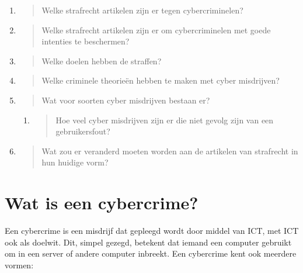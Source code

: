 \documentclass[
]{article}
\begin{document}
\begin{enumerate}
\def\labelenumi{\roman{enumi}.}
\item
  \begin{quote}
  Welke strafrecht artikelen zijn er tegen cybercriminelen?
  \end{quote}
\item
  \begin{quote}
  Welke strafrecht artikelen zijn er om cybercriminelen met goede
  intenties te beschermen?
  \end{quote}
\item
  \begin{quote}
  Welke doelen hebben de straffen?
  \end{quote}
\item
  \begin{quote}
  Welke criminele theorieën hebben te maken met cyber misdrijven?
  \end{quote}
\item
  \begin{quote}
  Wat voor soorten cyber misdrijven bestaan er?
  \end{quote}

  \begin{enumerate}
  \def\labelenumii{\alph{enumii}.}
  \item
    \begin{quote}
    Hoe veel cyber misdrijven zijn er die niet gevolg zijn van een
    gebruikersfout?
    \end{quote}
  \end{enumerate}
\item
  \begin{quote}
  Wat zou er veranderd moeten worden aan de artikelen van strafrecht in
  hun huidige vorm?
  \end{quote}
\end{enumerate}

\hypertarget{wat-is-een-cybercrime}{%
\section{Wat is een cybercrime?}\label{wat-is-een-cybercrime}}

Een cybercrime is een misdrijf dat gepleegd wordt door middel van ICT,
met ICT ook als doelwit. Dit, simpel gezegd, betekent dat iemand een
computer gebruikt om in een server of andere computer inbreekt. Een
cybercrime kent ook meerdere vormen:
\end{document}
